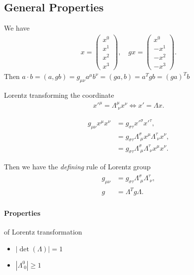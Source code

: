 \subsection{General Properties}
We have 
\begin{align*}
   x = \begin{pmatrix} x^0 \\ x^1 \\ x^2 \\ x^3 \end{pmatrix}, \quad 
   gx =  \begin{pmatrix} x^0 \\ -x^1 \\ -x^2 \\ -x^3 \end{pmatrix}.
\end{align*}
Then $a\cdot b = (a, gb) = g_{\mu\nu} a^\mu b^\nu = (ga, b) = a^Tgb = (ga)^T b$

Lorentz transforming the coordinate
\begin{align}
   x'^\mu = \Lambda^\mu_{\;\nu} x^\nu \Leftrightarrow x' = \Lambda x.
\end{align}

\begin{align*}
   g_{\mu\nu} x^\mu x^\nu &= g_{\sigma \tau} x'^\sigma x'^\tau, \\
                          &= g_{\sigma \tau} \Lambda^\sigma_{\; \mu} x^\mu \Lambda^\tau_{\;\nu} x^\nu, \\
                          &= g_{\sigma \tau} \Lambda^\sigma_{\; \mu} \Lambda^\tau_{\;\nu}x^\mu  x^\nu.
\end{align*}

Then we have the \textit{defining} rule of Lorentz group
\begin{align}
   \begin{split}
    g_{\mu\nu} &= g_{\sigma \tau}  \Lambda^\sigma_{\; \mu} \Lambda^\tau_{\;\nu}, \\
   g &= \Lambda^T g \Lambda.
   \end{split}
\end{align}

\paragraph{Properties} of Lorentz transformation
\begin{itemize}
   \item $\left|\det(\Lambda) \right| = 1$
   \item $\left|\Lambda^0_{\;0} \right| \geq 1$
\end{itemize}

